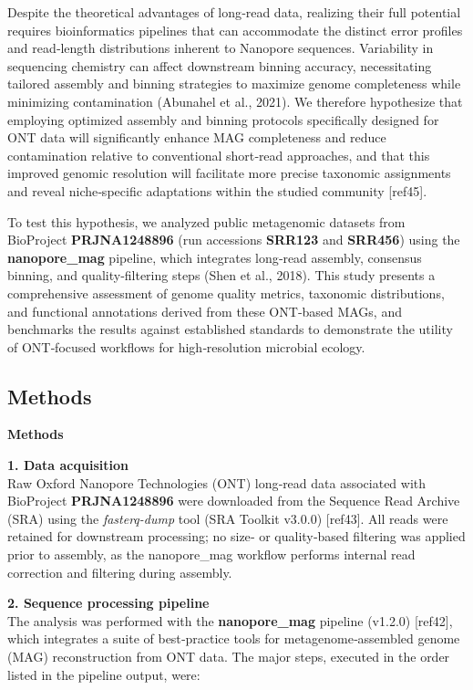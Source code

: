 \documentclass[
  11pt,
]{article}
\begin{document}
Despite the theoretical advantages of long‑read data, realizing their
full potential requires bioinformatics pipelines that can accommodate
the distinct error profiles and read‑length distributions inherent to
Nanopore sequences. Variability in sequencing chemistry can affect
downstream binning accuracy, necessitating tailored assembly and binning
strategies to maximize genome completeness while minimizing
contamination (Abunahel et al., 2021). We therefore hypothesize that
employing optimized assembly and binning protocols specifically designed
for ONT data will significantly enhance MAG completeness and reduce
contamination relative to conventional short‑read approaches, and that
this improved genomic resolution will facilitate more precise taxonomic
assignments and reveal niche‑specific adaptations within the studied
community {[}ref45{]}.

To test this hypothesis, we analyzed public metagenomic datasets from
BioProject \textbf{PRJNA1248896} (run accessions \textbf{SRR123} and
\textbf{SRR456}) using the \textbf{nanopore\_mag} pipeline, which
integrates long‑read assembly, consensus binning, and quality‑filtering
steps (Shen et al., 2018). This study presents a comprehensive
assessment of genome quality metrics, taxonomic distributions, and
functional annotations derived from these ONT‑based MAGs, and benchmarks
the results against established standards to demonstrate the utility of
ONT‑focused workflows for high‑resolution microbial ecology.

\subsection{Methods}\label{methods}

\textbf{Methods}

\textbf{1. Data acquisition}\\
Raw Oxford Nanopore Technologies (ONT) long‑read data associated with
BioProject \textbf{PRJNA1248896} were downloaded from the Sequence Read
Archive (SRA) using the \emph{fasterq-dump} tool (SRA Toolkit v3.0.0)
{[}ref43{]}. All reads were retained for downstream processing; no size‑
or quality‑based filtering was applied prior to assembly, as the
nanopore\_mag workflow performs internal read correction and filtering
during assembly.

\textbf{2. Sequence processing pipeline}\\
The analysis was performed with the \textbf{nanopore\_mag} pipeline
(v1.2.0) {[}ref42{]}, which integrates a suite of best‑practice tools
for metagenome‑assembled genome (MAG) reconstruction from ONT data. The
major steps, executed in the order listed in the pipeline output, were:
\end{document}
